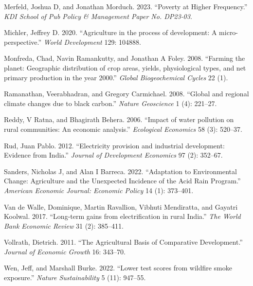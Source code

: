 \documentclass[
]{article}
\newlength{\cslhangindent}
\newlength{\cslentryspacingunit} %
\newenvironment{CSLReferences}[2] %
 {%
  \setlength{\parindent}{0pt}
  \ifodd #1
  \let\oldpar\par
  \def\par{\hangindent=\cslhangindent\oldpar}
  \fi
  \setlength{\parskip}{#2\cslentryspacingunit}
 }%
 {}
\begin{document}
\begin{CSLReferences}{1}{0}
\leavevmode{}%
Merfeld, Joshua D, and Jonathan Morduch. 2023. {``Poverty at Higher Frequency.''} \emph{{KDI School of Pub Policy \& Management Paper No. DP23-03}}.

\leavevmode{}%
Michler, Jeffrey D. 2020. {``{Agriculture in the process of development: A micro-perspective}.''} \emph{{World Development}} 129: 104888.

\leavevmode{}%
Monfreda, Chad, Navin Ramankutty, and Jonathan A Foley. 2008. {``{Farming the planet: Geographic distribution of crop areas, yields, physiological types, and net primary production in the year 2000}.''} \emph{{Global Biogeochemical Cycles}} 22 (1).

\leavevmode{}%
Ramanathan, Veerabhadran, and Gregory Carmichael. 2008. {``{Global and regional climate changes due to black carbon}.''} \emph{{Nature Geoscience}} 1 (4): 221--27.

\leavevmode{}%
Reddy, V Ratna, and Bhagirath Behera. 2006. {``{Impact of water pollution on rural communities: An economic analysis}.''} \emph{{Ecological Economics}} 58 (3): 520--37.

\leavevmode{}%
Rud, Juan Pablo. 2012. {``{Electricity provision and industrial development: Evidence from India}.''} \emph{{Journal of Development Economics}} 97 (2): 352--67.

\leavevmode{}%
Sanders, Nicholas J, and Alan I Barreca. 2022. {``{Adaptation to Environmental Change: Agriculture and the Unexpected Incidence of the Acid Rain Program}.''} \emph{{American Economic Journal: Economic Policy}} 14 (1): 373--401.

\leavevmode{}%
Van de Walle, Dominique, Martin Ravallion, Vibhuti Mendiratta, and Gayatri Koolwal. 2017. {``{Long-term gains from electrification in rural India}.''} \emph{{The World Bank Economic Review}} 31 (2): 385--411.

\leavevmode{}%
Vollrath, Dietrich. 2011. {``The Agricultural Basis of Comparative Development.''} \emph{{Journal of Economic Growth}} 16: 343--70.

\leavevmode{}%
Wen, Jeff, and Marshall Burke. 2022. {``{Lower test scores from wildfire smoke exposure}.''} \emph{{Nature Sustainability}} 5 (11): 947--55.

\end{CSLReferences}
\end{document}
